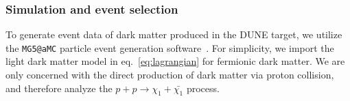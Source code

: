 \subsubsection{Simulation and event selection}
To generate event data of dark matter produced in the DUNE target, we
utilize the \texttt{MG5@aMC} particle event generation software~\cite{Alwall:2014hca}. 
For simplicity, we import 
the light dark matter model in eq.~\eqref{eq:lagrangian} for fermionic dark matter. We are only concerned with the direct production of dark matter via proton collision, and therefore analyze  the $p + p \rightarrow \chi_1 + \bar{\chi_1}$ process. 
%
    
